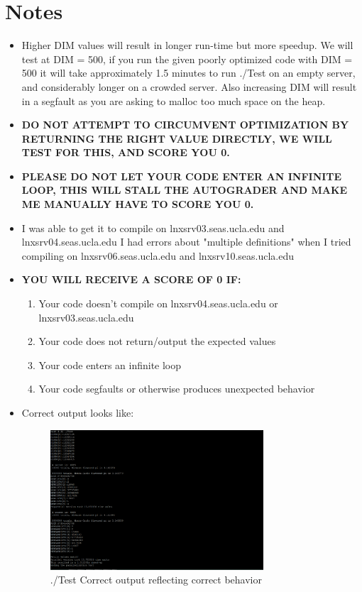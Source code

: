 \documentclass[11pt]{article}
\begin{document}
\section{Notes}
\begin{itemize}
    \item Higher DIM values will result in longer run-time but more speedup. We will test at DIM = 500, if you run the given poorly optimized code with DIM = 500 it will take approximately 1.5 minutes to run ./Test on an empty server, and considerably longer on a crowded server. Also increasing DIM will result in a segfault as you are asking to malloc too much space on the heap.
    \item \textbf{DO NOT ATTEMPT TO CIRCUMVENT OPTIMIZATION BY RETURNING THE RIGHT VALUE DIRECTLY, WE WILL TEST FOR THIS, AND SCORE YOU 0.}
    \item \textbf{PLEASE DO NOT LET YOUR CODE ENTER AN INFINITE LOOP, THIS WILL STALL THE AUTOGRADER AND MAKE ME MANUALLY HAVE TO SCORE YOU 0.}
    \item I was able to get it to compile on lnxsrv03.seas.ucla.edu and lnxsrv04.seas.ucla.edu I had errors about "multiple definitions" when I tried compiling on lnxsrv06.seas.ucla.edu and lnxsrv10.seas.ucla.edu
    \item \textbf{YOU WILL RECEIVE A SCORE OF 0 IF:}
        \begin{enumerate}
            \item Your code doesn't compile on lnxsrv04.seas.ucla.edu or lnxsrv03.seas.ucla.edu
            \item Your code does not return/output the expected values
            \item Your code enters an infinite loop
            \item Your code segfaults or otherwise produces unexpected behavior
        \end{enumerate}
        
    \item Correct output looks like:
    \begin{figure}[h]
    \centering
        \includegraphics[width=0.75\textwidth]{correct_output.PNG}
        \caption{./Test Correct output reflecting correct behavior}
        \label{fig:test1}
    \end{figure}
\end{itemize}
\end{document}
